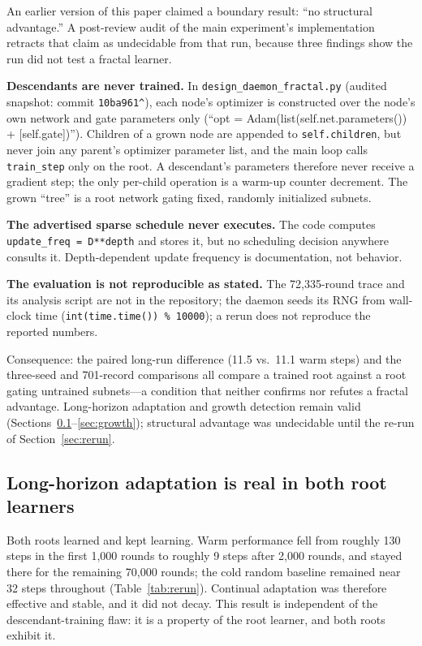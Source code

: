 \documentclass[11pt]{article}
\begin{document}
An earlier version of this paper claimed a boundary result: ``no structural advantage.'' A post-review audit of the main experiment's implementation retracts that claim as undecidable from that run, because three findings show the run did not test a fractal learner.

\textbf{Descendants are never trained.} In \texttt{design\_daemon\_fractal.py} (audited snapshot: commit \texttt{10ba961\textasciicircum}), each node's optimizer is constructed over the node's own network and gate parameters only (``opt = Adam(list(self.net.parameters()) + [self.gate])''). Children of a grown node are appended to \texttt{self.children}, but never join any parent's optimizer parameter list, and the main loop calls \texttt{train\_step} only on the root. A descendant's parameters therefore never receive a gradient step; the only per-child operation is a warm-up counter decrement. The grown ``tree'' is a root network gating fixed, randomly initialized subnets.

\textbf{The advertised sparse schedule never executes.} The code computes \texttt{update\_freq = D**depth} and stores it, but no scheduling decision anywhere consults it. Depth-dependent update frequency is documentation, not behavior.

\textbf{The evaluation is not reproducible as stated.} The 72,335-round trace and its analysis script are not in the repository; the daemon seeds its RNG from wall-clock time (\texttt{int(time.time()) \% 10000}); a rerun does not reproduce the reported numbers.

Consequence: the paired long-run difference (11.5 vs.\ 11.1 warm steps) and the three-seed and 701-record comparisons all compare a trained root against a root gating untrained subnets---a condition that neither confirms nor refutes a fractal advantage. Long-horizon adaptation and growth detection remain valid (Sections~\ref{sec:adapt}--\ref{sec:growth}); structural advantage was undecidable until the re-run of Section~\ref{sec:rerun}.

\subsection{Long-horizon adaptation is real in both root learners}\label{sec:adapt}

Both roots learned and kept learning. Warm performance fell from roughly 130 steps in the first 1,000 rounds to roughly 9 steps after 2,000 rounds, and stayed there for the remaining 70,000 rounds; the cold random baseline remained near 32 steps throughout (Table~\ref{tab:rerun}). Continual adaptation was therefore effective and stable, and it did not decay. This result is independent of the descendant-training flaw: it is a property of the root learner, and both roots exhibit it.
\end{document}
